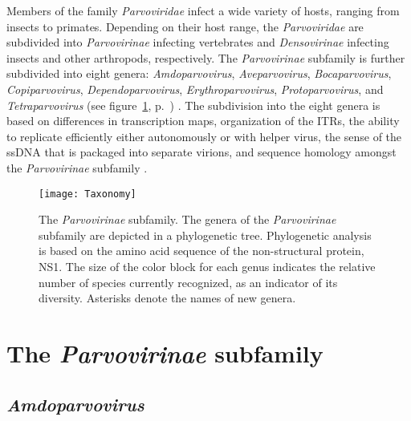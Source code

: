 Members of the family \textit{Parvoviridae} infect a wide variety of hosts, ranging from insects to primates.
Depending on their host range, the \textit{Parvoviridae} are subdivided into \textit{Parvovirinae} infecting vertebrates and \textit{Densovirinae} infecting insects and other arthropods, respectively. The \textit{Parvovirinae} subfamily is further subdivided into eight genera: \textit{Amdoparvovirus}, \textit{Aveparvovirus}, \textit{Bocaparvovirus}, \textit{Copiparvovirus}, \textit{Dependoparvovirus}, \textit{Erythroparvovirus}, \textit{Protoparvovirus}, and \textit{Tetraparvovirus} (see figure~\ref{Fig: Taxonomy}, p.~\pageref{Fig: Taxonomy}) \cite{pmid24212889}. The subdivision into the eight genera is based on differences in transcription maps, organization of the ITRs, the ability to replicate efficiently either autonomously or with helper virus, the sense of the ssDNA that is packaged into separate virions, and sequence homology amongst the \textit{Parvovirinae} subfamily \cite{pmid11222696, icvt}.


\begin{figure}[h]
\centering
\texttt{[image: Taxonomy]}
\caption[The \textit{Parvovirinae} subfamily]{The \textit{Parvovirinae} subfamily. The genera of the \textit{Parvovirinae} subfamily are depicted in a phylogenetic tree. Phylogenetic analysis is based on the amino acid sequence of the non-structural protein, NS1. The size of the color block for each genus indicates the relative number of species currently recognized, as an indicator of its diversity. Asterisks denote the names of new genera.} 
\label{Fig: Taxonomy}
\end{figure}



\section{The \textit{Parvovirinae} subfamily}
\label{sec: The Parvovirinae subfamily}   


\subsection{\textit{Amdoparvovirus}}

